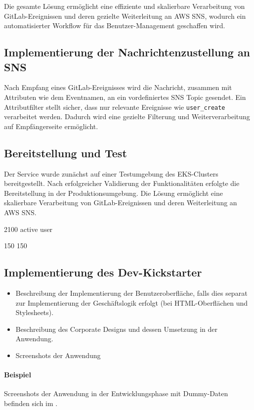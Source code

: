 Die gesamte Lösung ermöglicht eine effiziente und skalierbare Verarbeitung von GitLab-Ereignissen und deren gezielte Weiterleitung an AWS SNS, wodurch ein automatisierter Workflow für das Benutzer-Management geschaffen wird.

\subsection{Implementierung der Nachrichtenzustellung an SNS}
\label{sec:ImplementierungSNS}

Nach Empfang eines GitLab-Ereignisses wird die Nachricht, zusammen mit Attributen wie dem Eventnamen, an ein vordefiniertes SNS Topic gesendet. Ein Attributfilter stellt sicher, dass nur relevante Ereignisse wie \texttt{user\_create} verarbeitet werden. Dadurch wird eine gezielte Filterung und Weiterverarbeitung auf Empfängerseite ermöglicht.

\subsection{Bereitstellung und Test}
\label{sec:BereitstellungTest}

Der Service wurde zunächst auf einer Testumgebung des EKS-Clusters bereitgestellt. Nach erfolgreicher Validierung der Funktionalitäten erfolgte die Bereitstellung in der Produktionsumgebung. Die Lösung ermöglicht eine skalierbare Verarbeitung von GitLab-Ereignissen und deren Weiterleitung an AWS SNS.

2100 active user

150
150


\subsection{Implementierung des Dev-Kickstarter}
\label{sec:ImplementierungBenutzeroberflaeche}

\begin{itemize}
	\item Beschreibung der Implementierung der Benutzeroberfläche, falls dies separat zur Implementierung der Geschäftslogik erfolgt (\zB bei \acs{HTML}-Oberflächen und Stylesheets).
	\item \Ggfs Beschreibung des Corporate Designs und dessen Umsetzung in der Anwendung.
	\item Screenshots der Anwendung
\end{itemize}

\paragraph{Beispiel}
Screenshots der Anwendung in der Entwicklungsphase mit Dummy-Daten befinden sich im .


